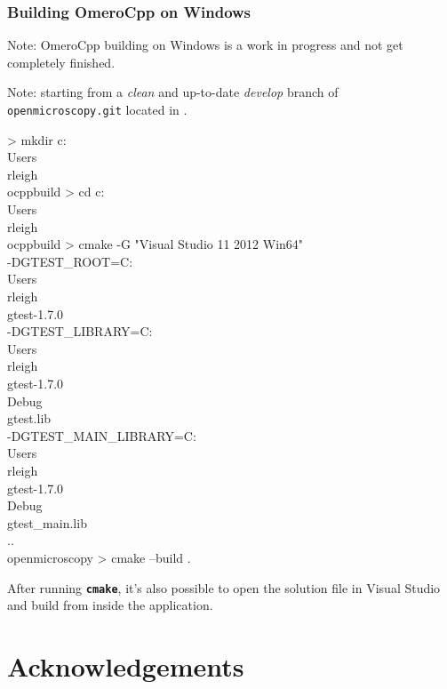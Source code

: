 \documentclass{beamer}
\newcommand{\cmd}[1]{\textbf{\texttt{#1}}}
\newcommand{\pkg}[1]{\texttt{#1}}
\begin{document}
\begin{frame}[fragile]
  \frametitle{Building OmeroCpp on Windows}
  \scriptsize

  Note: OmeroCpp building on Windows is a work in progress and not get
  completely finished.

  \bigskip
  Note: starting from a \emph{clean} and up-to-date \emph{develop}
  branch of \pkg{openmicroscopy.git} located in
  .

  \begin{semiverbatim}
> mkdir c:\\Users\\rleigh\\ocppbuild
> cd c:\\Users\\rleigh\\ocppbuild
> cmake -G "Visual Studio 11 2012 Win64" \\
  -DGTEST_ROOT=C:\\Users\\rleigh\\gtest-1.7.0 \\
  -DGTEST_LIBRARY=C:\\Users\\rleigh\\gtest-1.7.0\\Debug\\gtest.lib \\
  -DGTEST_MAIN_LIBRARY=C:\\Users\\rleigh\\gtest-1.7.0\\Debug\\gtest_main.lib \\
  ..\\openmicroscopy
> cmake --build .
\end{semiverbatim}

After running \cmd{cmake}, it's also possible to open the solution
file in Visual Studio and build from inside the application.
\end{frame}

\appendix

\section[]{Acknowledgements}
\end{document}

